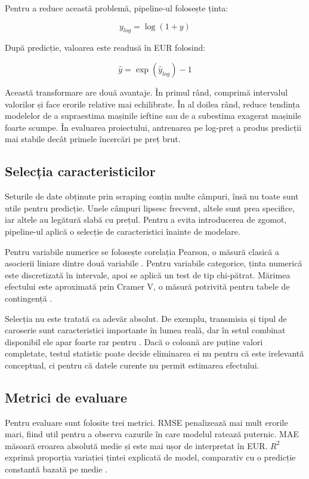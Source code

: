 Pentru a reduce această problemă, pipeline-ul folosește ținta:

\[
    y_{log} = \log(1 + y)
\]

După predicție, valoarea este readusă în EUR folosind:

\[
    \hat{y} = \exp(\hat{y}_{log}) - 1
\]

Această transformare are două avantaje. În primul rând, comprimă intervalul valorilor și face erorile relative mai echilibrate. În al doilea rând, reduce tendința modelelor de a supraestima mașinile ieftine sau de a subestima exagerat mașinile foarte scumpe. În evaluarea proiectului, antrenarea pe log-preț a produs predicții mai stabile decât primele încercări pe preț brut.

\subsection{Selecția caracteristicilor}
\label{sec:background-feature-selection}

Seturile de date obținute prin scraping conțin multe câmpuri, însă nu toate sunt utile pentru predicție. Unele câmpuri lipsesc frecvent, altele sunt prea specifice, iar altele au legătură slabă cu prețul. Pentru a evita introducerea de zgomot, pipeline-ul aplică o selecție de caracteristici înainte de modelare.

Pentru variabile numerice se folosește corelația Pearson, o măsură clasică a asocierii liniare dintre două variabile \cite{pearson1895correlation}. Pentru variabile categorice, ținta numerică este discretizată în intervale, apoi se aplică un test de tip chi-pătrat. Mărimea efectului este aproximată prin Cramer V, o măsură potrivită pentru tabele de contingență \cite{cramer1946mathematical}.

Selecția nu este tratată ca adevăr absolut. De exemplu, transmisia și tipul de caroserie sunt caracteristici importante în lumea reală, dar în setul combinat disponibil ele apar foarte rar pentru \autovit. Dacă o coloană are puține valori completate, testul statistic poate decide eliminarea ei nu pentru că este irelevantă conceptual, ci pentru că datele curente nu permit estimarea efectului.

\subsection{Metrici de evaluare}
\label{sec:background-metrics}

Pentru evaluare sunt folosite trei metrici. RMSE penalizează mai mult erorile mari, fiind util pentru a observa cazurile în care modelul ratează puternic. MAE măsoară eroarea absolută medie și este mai ușor de interpretat în EUR. \(R^2\) exprimă proporția variației țintei explicată de model, comparativ cu o predicție constantă bazată pe medie \cite{sklearn_metrics}.

